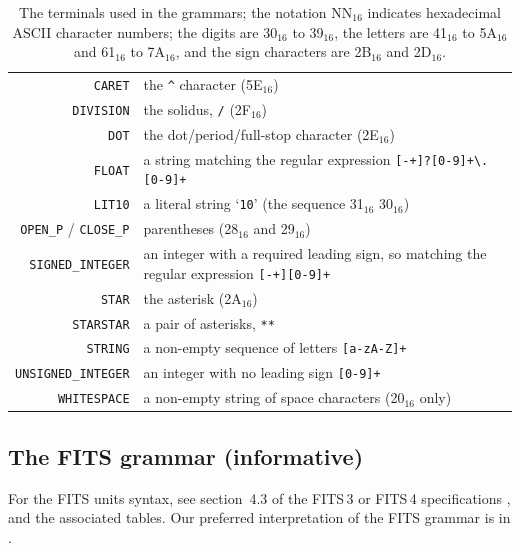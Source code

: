 \documentclass[11pt,a4paper]{ivoa}
\newcommand*\hex[1]{\uppercase{#1}${}_{16}$}
\begin{document}
\begin{table}[ht]
\begin{tabular}{rL{8.5cm}}
\texttt{CARET}&the \texttt{\^{}} character (\hex{5e})\\
\texttt{DIVISION}&the solidus, \texttt{/} (\hex{2f})\\
\texttt{DOT}&the dot/period/full-stop character (\hex{2e})\\
\texttt{FLOAT}&a string matching the regular expression
       \texttt{[-+]?[0-9]+\textbackslash.[0-9]+}\\
\texttt{LIT10}&a literal string `\texttt{10}' (the sequence \hex{31} \hex{30})\\
\texttt{OPEN\_P} / \texttt{CLOSE\_P}&parentheses (\hex{28} and \hex{29})\\
\texttt{SIGNED\_INTEGER}&an integer with a required leading sign, so
matching the regular expression \texttt{[-+][0-9]+}\\
\texttt{STAR}&the asterisk (\hex{2a})\\
\texttt{STARSTAR}&a pair of asterisks, \texttt{**}\\
\texttt{STRING}&a non-empty sequence of letters \texttt{[a-zA-Z]+}\\
\texttt{UNSIGNED\_INTEGER}&an integer with no leading sign \texttt{[0-9]+}\\
\texttt{WHITESPACE}&a non-empty string of space characters (\hex{20} only)\\
\end{tabular}
\caption[The terminals used in the grammars]
{\label{tabx:terminals}The terminals used in the grammars; the
notation \hex{nn} indicates hexadecimal ASCII character numbers;
the digits are \hex{30} to \hex{39}, the letters are \hex{41} to \hex{5a} and \hex{61} to
\hex{7a}, and the sign characters are \hex{2b} and \hex{2d}.}
\end{table}

\subsection{The FITS grammar (informative)}
\label{appx:fitsgrammar}

For the FITS units syntax, see section~4.3 of the FITS\,3
or FITS\,4 specifications \citep{pence10,fits4}, and the
associated tables.  Our preferred interpretation of the FITS grammar
is in .
\end{document}
